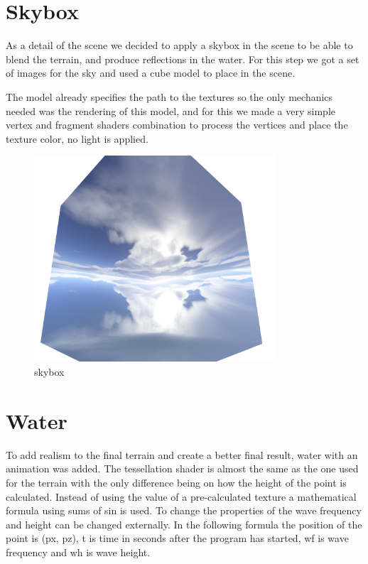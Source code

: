 \documentclass[a4paper]{report}
\begin{document}
\section{Skybox}

As a detail of the scene we decided to apply a skybox in the scene to be able to blend the terrain, and
produce reflections in the water. For this step we got a set of images for the sky and used a cube model
to place in the scene. 

The model already specifies the path to the textures so the only mechanics needed was the rendering of
this model, and for this we made a very simple vertex and fragment shaders combination to process the vertices
and place the texture color, no light is applied.

\begin{figure}[H]
  \centering
  \includegraphics[width=0.8\textwidth]{images/skybox.png}
  \caption{skybox}
\end{figure}


\section{Water}

To add realism to the final terrain and create a better final result, water with an animation was added.
The tessellation shader is almost the same as the one used for the terrain with the only difference being on
how the height of the point is calculated. Instead of using the value of a pre-calculated texture a
mathematical formula using sums of sin is used. To change the properties of the wave frequency and height
can be changed externally. In the following formula the position of the point is (px, pz), t is time in
seconds after the program has started, wf is wave frequency and wh is wave height.
\end{document}

